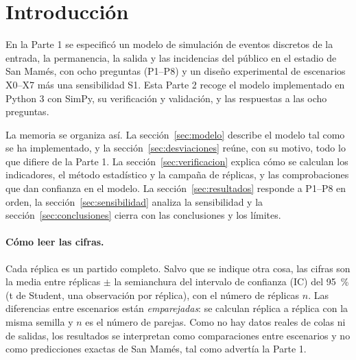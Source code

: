 \section{Introducción}

En la Parte 1 se especificó un modelo de simulación de eventos discretos de la
entrada, la permanencia, la salida y las incidencias del público en el estadio
de San Mamés, con ocho preguntas (P1--P8) y un diseño experimental de escenarios
X0--X7 más una sensibilidad S1. Esta Parte 2 recoge el modelo implementado en
Python 3 con SimPy, su verificación y validación, y las respuestas a las ocho
preguntas.

La memoria se organiza así. La sección~\ref{sec:modelo} describe el modelo tal
como se ha implementado, y la sección~\ref{sec:desviaciones} reúne, con su
motivo, todo lo que difiere de la Parte 1. La sección~\ref{sec:verificacion}
explica cómo se calculan los indicadores, el método estadístico y la campaña de
réplicas, y las comprobaciones que dan confianza en el modelo. La
sección~\ref{sec:resultados} responde a P1--P8 en orden, la
sección~\ref{sec:sensibilidad} analiza la sensibilidad y la
sección~\ref{sec:conclusiones} cierra con las conclusiones y los límites.

\paragraph{Cómo leer las cifras.} Cada réplica es un partido completo. Salvo que
se indique otra cosa, las cifras son la media entre réplicas $\pm$ la
semianchura del intervalo de confianza (IC) del 95~\% (t de Student, una
observación por réplica), con el número de réplicas $n$. Las diferencias entre
escenarios están \emph{emparejadas}: se calculan réplica a réplica con la misma
semilla y $n$ es el número de parejas. Como no hay datos reales de colas ni de
salidas, los resultados se interpretan como comparaciones entre escenarios y no
como predicciones exactas de San Mamés, tal como advertía la Parte 1.
